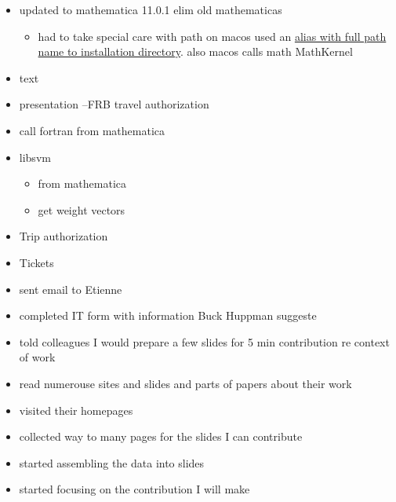 \documentclass[hyperref]{labbook}
\begin{document}
\begin{itemize}
\item {updated to mathematica 11.0.1 elim old mathematicas}
  \begin{itemize}
  \item had to take special care with path on macos used an
    \href{http://superuser.com/questions/896340/symlinking-executable-surrounded-with-dylib-not-working}{alias with full path name to installation directory}.  also macos calls math MathKernel
  \end{itemize}
  \item text
  \item presentation --FRB travel authorization
\item call fortran from mathematica
\item libsvm
  \begin{itemize}
  \item from mathematica
  \item get weight vectors
  \end{itemize}
\end{itemize}



\begin{itemize}
\item Trip authorization
\item Tickets
\end{itemize}


\begin{itemize}
\item sent email to Etienne
\item completed IT form with information Buck Huppman suggeste
\end{itemize}

\begin{itemize}
\item told colleagues I would prepare a few slides for 5 min contribution re context of work
\item read numerouse sites and slides and parts of papers about their work
\item visited their homepages
\item collected way to many pages for the slides I can contribute
\item started assembling the data into slides
\item started focusing on the contribution I will make
\end{itemize}
\end{document}
